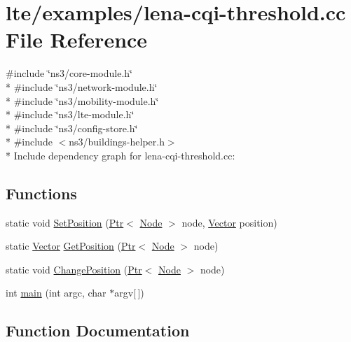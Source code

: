 \hypertarget{lena-cqi-threshold_8cc}{}\section{lte/examples/lena-\/cqi-\/threshold.cc File Reference}
\label{lena-cqi-threshold_8cc}
{\ttfamily \#include \char`\"{}ns3/core-\/module.\+h\char`\"{}}\\*
{\ttfamily \#include \char`\"{}ns3/network-\/module.\+h\char`\"{}}\\*
{\ttfamily \#include \char`\"{}ns3/mobility-\/module.\+h\char`\"{}}\\*
{\ttfamily \#include \char`\"{}ns3/lte-\/module.\+h\char`\"{}}\\*
{\ttfamily \#include \char`\"{}ns3/config-\/store.\+h\char`\"{}}\\*
{\ttfamily \#include $<$ns3/buildings-\/helper.\+h$>$}\\*
Include dependency graph for lena-\/cqi-\/threshold.cc\+:
\subsection*{Functions}
\begin{DoxyCompactItemize}
\item 
static void \hyperlink{lena-cqi-threshold_8cc_aac02abe91b3e5592e31bc0f7d844bf4d}{Set\+Position} (\hyperlink{classns3_1_1Ptr}{Ptr}$<$ \hyperlink{classns3_1_1Node}{Node} $>$ node, \hyperlink{classns3_1_1Vector3D_a7e59b47bc94c9cb1dadff68c1d0112d8}{Vector} position)
\item 
static \hyperlink{classns3_1_1Vector3D_a7e59b47bc94c9cb1dadff68c1d0112d8}{Vector} \hyperlink{lena-cqi-threshold_8cc_acebf763e1a0478cec225f9547941ae54}{Get\+Position} (\hyperlink{classns3_1_1Ptr}{Ptr}$<$ \hyperlink{classns3_1_1Node}{Node} $>$ node)
\item 
static void \hyperlink{lena-cqi-threshold_8cc_a788bbe00a65fa13f4e4825f94fae3805}{Change\+Position} (\hyperlink{classns3_1_1Ptr}{Ptr}$<$ \hyperlink{classns3_1_1Node}{Node} $>$ node)
\item 
int \hyperlink{lena-cqi-threshold_8cc_a0ddf1224851353fc92bfbff6f499fa97}{main} (int argc, char $\ast$argv\mbox{[}$\,$\mbox{]})
\end{DoxyCompactItemize}


\subsection{Function Documentation}
